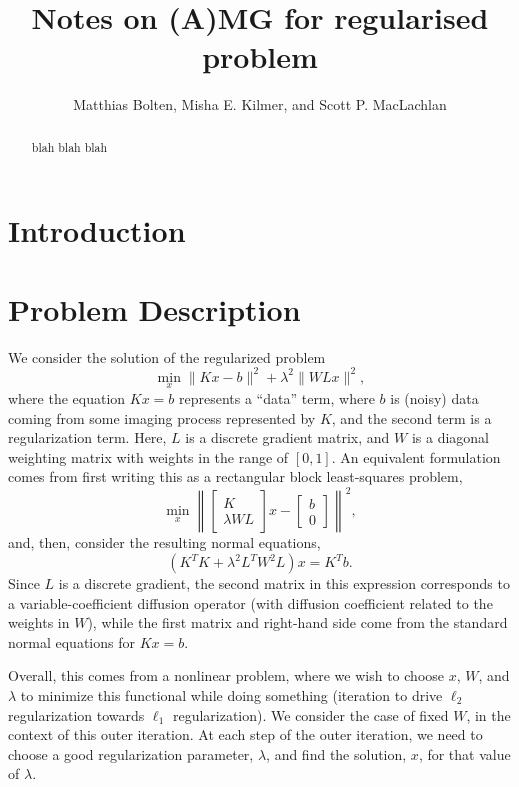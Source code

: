 \documentclass{article}
\title{Notes on (A)MG for regularised problem}
\author{Matthias Bolten, Misha E. Kilmer, and Scott P. MacLachlan}
\begin{document}
\maketitle

\begin{abstract}
blah blah blah
\end{abstract}


\section{Introduction}


\section{Problem Description}

We consider the solution of the regularized problem
\begin{equation}
\label{eq:regularized}
\min_{x} \|Kx-b\|^2 + \lambda^2\|WLx\|^2,
\end{equation}
where the equation $Kx=b$ represents a ``data'' term, where $b$ is
(noisy) data coming from some imaging process represented by $K$, and
the second term is a regularization term.  Here, $L$ is a discrete
gradient matrix, and $W$ is a diagonal weighting matrix with weights
in the range of $[0,1]$.  An equivalent formulation comes from first
writing this as a rectangular block least-squares problem,
\[
\min_{x} \left\| \left[\begin{array}{c} K \\ \lambda
      WL\end{array}\right]x - \left[\begin{array}{c} b \\ 0 \end{array}\right]\right\|^2,
\]
and, then, consider the resulting normal equations,
\begin{equation}
\label{eq:normal}
\left(K^TK + \lambda^2 L^TW^2L\right)x = K^Tb.
\end{equation}
Since $L$ is a discrete gradient, the second matrix in this expression
corresponds to a variable-coefficient diffusion operator (with
diffusion coefficient related to the weights in $W$), while the first
matrix and right-hand side come from the standard normal equations for
$Kx=b$.

Overall, this comes from a nonlinear problem, where we wish to choose
$x$, $W$, and $\lambda$ to minimize this functional while doing
something (iteration to drive $\ell_2$ regularization towards $\ell_1$
regularization).  We consider the case of fixed $W$, in the context of
this outer iteration.  At each step of the outer iteration, we need to
choose a good regularization parameter, $\lambda$, and find the
solution, $x$, for that value of $\lambda$.
\end{document}
